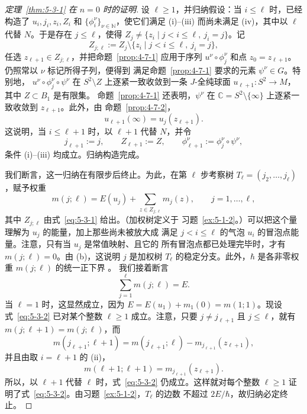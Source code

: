 \begin{proof}[定理~\ref{thm:5-3-1} 在 $n=0$ 时的证明]
设 $\ell\ge1$，并归纳假设：当 $i\le\ell$ 时，已经构造了
$u_i,j_i,z_i,Z_i$ 和 $\{\phi_i^\nu\}_{\nu\in\mathbb N}$，使它们满足
(i)--(iii) 而尚未满足 (iv)，其中以 $\ell$ 代替 $N$。于是存在 $j\le\ell$，使得
$Z_j\ne\{z_i\mid j<i\le\ell,\ j_i=j\}$。记
\begin{equation}\label{eq:5-3-1}
  Z_{j;\ell}:=Z_j\setminus\{z_i\mid j<i\le\ell,\ j_i=j\},
\end{equation}
任选 $z_{\ell+1}\in Z_{j;\ell}$，并把命题~\ref{prop:4-7-1} 应用于序列
$u^\nu\circ\phi_j^\nu$ 和点 $z_0=z_{\ell+1}$。仍照常以 $\nu$ 标记所得子列，便得到
满足命题~\ref{prop:4-7-1} 要求的元素 $\psi^\nu\in G$。特别地，
$u^\nu\circ\phi_j^\nu\circ\psi^\nu$ 在 $S^2\setminus Z$ 上逐紧一致收敛到一条
$J$-全纯球面 $u_{\ell+1}:S^2\to M$，其中 $Z\subset B_1$ 是有限集。
命题~\ref{prop:4-7-1} 还表明，$\psi^\nu$ 在
$\mathbb C=S^2\setminus\{\infty\}$ 上逐紧一致收敛到 $z_{\ell+1}$。此外，由
命题~\ref{prop:4-7-2}，
\[
  u_{\ell+1}(\infty)=u_j(z_{\ell+1}).
\]
这说明，当 $i\le\ell+1$ 时，以 $\ell+1$ 代替 $N$，并令
\[
  j_{\ell+1}:=j,
  \qquad Z_{\ell+1}:=Z,
  \qquad \phi_{\ell+1}^\nu:=\phi_j^\nu\circ\psi^\nu,
\]
条件 (i)--(iii) 均成立。归纳构造完成。

我们断言，这一归纳在有限步后终止。为此，在第 $\ell$ 步考察树
$T_\ell=(j_2,\ldots,j_\ell)$，赋予权重
\[
  m(j;\ell)=E(u_j)+\sum_{z\in Z_{j;\ell}}m_j(z),
  \qquad j=1,\ldots,\ell,
\]
其中 $Z_{j;\ell}$ 由式~\eqref{eq:5-3-1} 给出。（加权树定义于
习题~\ref{ex:5-1-2}。）可以把这个量理解为 $u_j$ 的能量，加上那些尚未被放大成
满足 $j<i\le\ell$ 的气泡 $u_i$ 的冒泡点能量。注意，只有当 $u_j$ 是常值映射、且它的
所有冒泡点都已处理完毕时，才有 $m(j;\ell)=0$。由 (b)，这说明 $j$ 是加权树
$T_\ell$ 的稳定分支。此外，$\hbar$ 是各非零权重 $m(j;\ell)$ 的统一正下界
。
我们接着断言
\begin{equation}\label{eq:5-3-2}
  \sum_{j=1}^{\ell}m(j;\ell)=E.
\end{equation}
当 $\ell=1$ 时，这显然成立，因为
$E=E(u_1)+m_1(0)=m(1;1)$。现设式~\eqref{eq:5-3-2} 已对某个整数 $\ell\ge1$
成立。注意，只要 $j\ne j_{\ell+1}$ 且 $j\le\ell$，就有
$m(j;\ell+1)=m(j;\ell)$，而
\[
  m(j_{\ell+1};\ell+1)
  =m(j_{\ell+1};\ell)-m_{j_{\ell+1}}(z_{\ell+1}),
\]
并且由取 $i=\ell+1$ 的 (ii)，
\[
  m(\ell+1;\ell+1)=m_{j_{\ell+1}}(z_{\ell+1}).
\]
所以，以 $\ell+1$ 代替 $\ell$ 时，式~\eqref{eq:5-3-2} 仍成立。这样就对每个整数
$\ell\ge1$ 证明了式~\eqref{eq:5-3-2}。由习题~\ref{ex:5-1-2}，$T_\ell$ 的边数
不超过 $2E/\hbar$，故归纳必定终止。


\end{proof}
